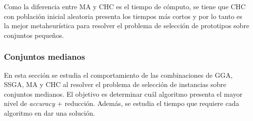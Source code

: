 Como la diferencia entre MA y CHC es el tiempo de cómputo, se tiene que CHC con población inicial aleatoria presenta los tiempos más cortos y por lo tanto es la mejor metaheurística para resolver el problema de selección de prototipos sobre conjuntos pequeños.


\subsubsection{Conjuntos medianos}

En esta sección se estudia el comportamiento de las combinaciones de GGA, SSGA, MA y CHC al resolver el problema de selección de instancias sobre conjuntos medianos. El objetivo es determinar cuál algoritmo presenta el mayor nivel de \emph{accuracy} + reducción. Además, se estudia el tiempo que requiere cada algoritmo en dar una solución.

